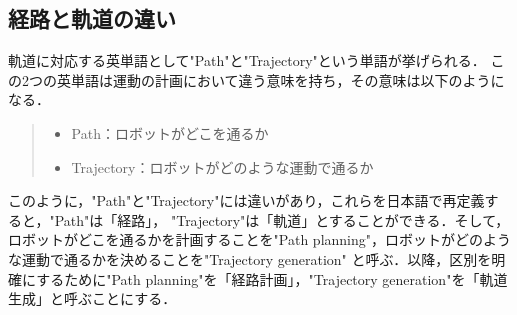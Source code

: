 
\subsection{経路と軌道の違い}

軌道に対応する英単語として"Path"と"Trajectory"という単語が挙げられる．
この2つの英単語は運動の計画において違う意味を持ち，その意味は以下のようになる．
\begin{quote}
     \begin{itemize}
      \item Path：ロボットがどこを通るか
      \item Trajectory：ロボットがどのような運動で通るか
     \end{itemize}
\end{quote}
このように，"Path"と"Trajectory"には違いがあり，これらを日本語で再定義すると，"Path"は「経路」，
"Trajectory"は「軌道」とすることができる．そして，ロボットがどこを通るかを計画することを"Path planning"，ロボットがどのような運動で通るかを決めることを"Trajectory generation"
と呼ぶ．以降，区別を明確にするために"Path planning"を「経路計画」，"Trajectory generation"を「軌道生成」と呼ぶことにする．
\newpage

